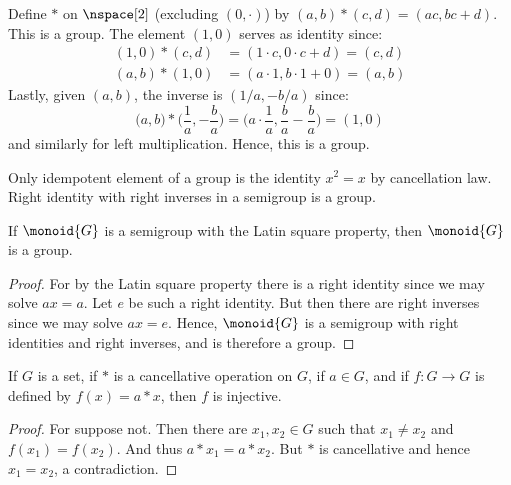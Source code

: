 \documentclass{article}                                                        %
\begin{document}
            \begin{example}
                Define $*$ on $\nspace[2]$ (excluding $(0,\cdot)$) by
                $(a,b)*(c,d)=(ac,bc+d)$. This is a group. The element $(1,0)$
                serves as identity since:
                \begin{align}
                    (1,0)*(c,d)&=(1\cdot{c},0\cdot{c}+d)=(c,d)\\
                    (a,b)*(1,0)&=(a\cdot{1},b\cdot{1}+0)=(a,b)
                \end{align}
                Lastly, given $(a,b)$, the inverse is $(1/a,\minus{b}/a)$ since:
                \begin{equation}
                    \big(a,b\big)*\big(\frac{1}{a},\minus\frac{b}{a}\big)
                        =\big(a\cdot\frac{1}{a},\frac{b}{a}-\frac{b}{a}\big)
                        =(1,0)
                \end{equation}
                and similarly for left multiplication. Hence, this is a group.
            \end{example}
            Only idempotent element of a group is the identity $x^{2}=x$ by
            cancellation law. Right identity with right inverses in a semigroup
            is a group.
            \begin{theorem}
                If $\monoid{G}$ is a semigroup with the Latin square property,
                then $\monoid{G}$ is a group.
            \end{theorem}
            \begin{proof}
                For by the Latin square property there is a right identity since
                we may solve $ax=a$. Let $e$ be such a right identity. But then
                there are right inverses since we may solve $ax=e$. Hence,
                $\monoid{G}$ is a semigroup with right identities and right
                inverses, and is therefore a group.
            \end{proof}
            \begin{theorem}
                If $G$ is a set, if $*$ is a cancellative operation on $G$,
                if $a\in{G}$, and if $f:G\rightarrow{G}$ is defined by
                $f(x)=a*x$, then $f$ is injective.
            \end{theorem}
            \begin{proof}
                For suppose not. Then there are $x_{1},x_{2}\in{G}$ such that
                $x_{1}\ne{x}_{2}$ and $f(x_{1})=f(x_{2})$. And thus
                $a*x_{1}=a*x_{2}$. But $*$ is cancellative and hence
                $x_{1}=x_{2}$, a contradiction.
            \end{proof}
\end{document}
